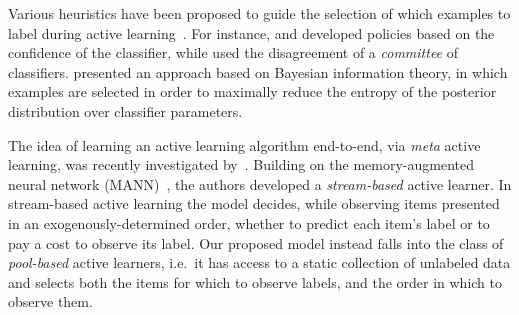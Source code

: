
Various heuristics have been proposed to guide the selection of which examples to label during active learning~\cite{settles2010active}. For instance, \citet{lewis1994sequential} and \citet{tong2001support} developed policies based on the confidence of the classifier, while \citet{gilad2005query} used the disagreement of a \emph{committee} of classifiers. \citet{houlsby2011bayesian} presented an approach based on Bayesian information theory,
in which examples are selected in order to maximally reduce the entropy of the posterior distribution over classifier parameters. 



The idea of learning an active learning algorithm end-to-end, via \emph{meta} active learning, was recently investigated  by~\citet{activeoneshot}. Building on the memory-augmented neural network (MANN)~\citep{santoro2016one}, the authors developed a \emph{stream-based} active learner. In stream-based active learning the model decides, while observing items presented in an exogenously-determined order, whether to predict each item's label or to pay a cost to observe its label. Our proposed model instead falls into the class of \emph{pool-based} active learners, i.e.~it has access to a static collection of unlabeled data and selects both the items for which to observe labels, and the order in which to observe them.

